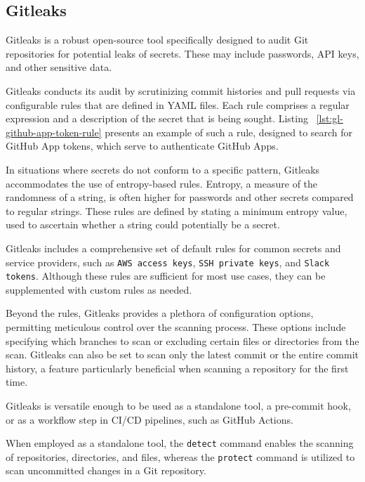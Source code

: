 \subsection{Gitleaks}\label{subsec:gitleaks}

Gitleaks is a robust open-source tool specifically designed to audit Git repositories for potential leaks of secrets.
These may include passwords, API keys, and other sensitive data.

Gitleaks conducts its audit by scrutinizing commit histories and pull requests via configurable rules that are defined in YAML files.
Each rule comprises a regular expression and a description of the secret that is being sought.
Listing ~\ref{lst:gl-github-app-token-rule} presents an example of such a rule, designed to search for GitHub App tokens, which serve to authenticate GitHub Apps.

In situations where secrets do not conform to a specific pattern, Gitleaks accommodates the use of entropy-based rules.
Entropy, a measure of the randomness of a string, is often higher for passwords and other secrets compared to regular strings.
These rules are defined by stating a minimum entropy value, used to ascertain whether a string could potentially be a secret.



Gitleaks includes a comprehensive set of default rules for common secrets and service providers, such as \texttt{AWS access keys}, \texttt{SSH private keys}, and \texttt{Slack tokens}.
Although these rules are sufficient for most use cases, they can be supplemented with custom rules as needed.

Beyond the rules, Gitleaks provides a plethora of configuration options, permitting meticulous control over the scanning process.
These options include specifying which branches to scan or excluding certain files or directories from the scan.
Gitleaks can also be set to scan only the latest commit or the entire commit history, a feature particularly beneficial when scanning a repository for the first time.

Gitleaks is versatile enough to be used as a standalone tool, a pre-commit hook, or as a workflow step in CI/CD pipelines, such as GitHub Actions.

When employed as a standalone tool, the \texttt{detect} command enables the scanning of repositories, directories, and files, whereas the \texttt{protect} command is utilized to scan uncommitted changes in a Git repository.

